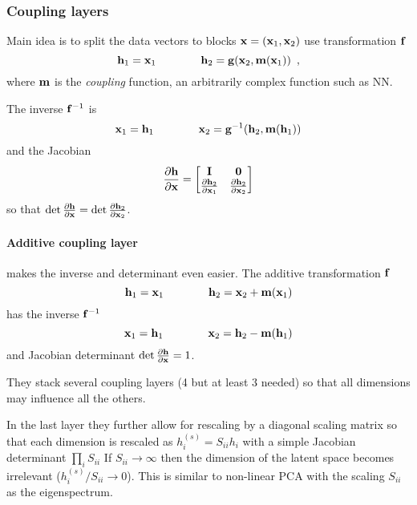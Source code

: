 \subsubsection{Coupling layers}

Main idea is to split the data vectors to blocks $\mathbf{x} = (\mathbf{x}_1, \mathbf{x}_2)$ use transformation $\mathbf{f}$
\begin{equation}
\mathbf{h}_1 = \mathbf{x}_1 \qquad \qquad \mathbf{h}_2 = \mathbf{g}(\mathbf{x}_2, \mathbf{m}(\mathbf{x}_1)) \enspace ,
\end{equation}
where $\mathbf{m}$ is the \emph{coupling} function, an arbitrarily complex function such as NN.

The inverse $\mathbf{f}^{-1}$ is
\begin{equation}
\mathbf{x}_1 = \mathbf{h}_1 \qquad \qquad \mathbf{x}_2 = \mathbf{g}^{-1}(\mathbf{h}_2, \mathbf{m}(\mathbf{h}_1))
\end{equation}
and the Jacobian
\begin{equation}
\frac{\partial \mathbf{h}}{\partial \mathbf{x}} =
\begin{bmatrix}
\mathbf{I} & \mathbf{0} \\
\frac{\partial \mathbf{h}_2}{\partial \mathbf{x}_1} & \frac{\partial \mathbf{h}_2}{\partial \mathbf{x}_2}
\end{bmatrix}
\end{equation}
so that $\det \frac{\partial \mathbf{h}}{\partial \mathbf{x}} = \det \frac{\partial \mathbf{h}_2}{\partial \mathbf{x}_2}$.

\paragraph{Additive coupling layer} makes the inverse and determinant even easier. The additive transformation $\mathbf{f}$
\begin{equation}
\mathbf{h}_1 = \mathbf{x}_1 \qquad \qquad \mathbf{h}_2 = \mathbf{x}_2 + \mathbf{m}(\mathbf{x}_1)
\end{equation}
has the inverse $\mathbf{f}^{-1}$
\begin{equation}
\mathbf{x}_1 = \mathbf{h}_1 \qquad \qquad \mathbf{x}_2 = \mathbf{h}_2 - \mathbf{m}(\mathbf{h}_1)
\end{equation}
and Jacobian determinant
$\det \frac{\partial \mathbf{h}}{\partial \mathbf{x}} = 1$.

They stack several coupling layers (4 but at least 3 needed) so that all dimensions may influence all the others.

In the last layer they further allow for rescaling by a diagonal scaling matrix so that each dimension is rescaled as $h_i^{(s)} = S_{ii} h_i$ with a simple Jacobian determinant $\prod_i S_{ii}$ If $S_{ii} \to \infty$ then the dimension of the latent space becomes irrelevant ($h_i^{(s)} / S_{ii} \to 0$).
This is similar to non-linear PCA with the scaling $S_{ii}$ as the eigenspectrum.

